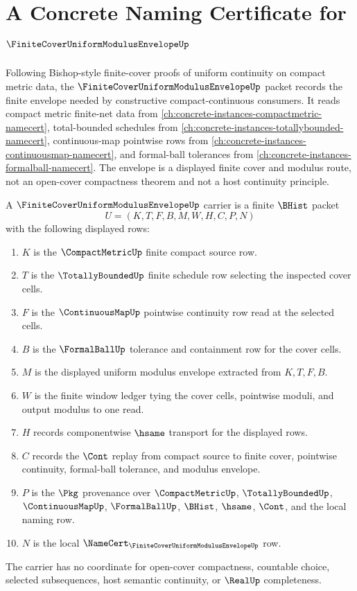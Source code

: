 \chapter{A Concrete Naming Certificate for $\FiniteCoverUniformModulusEnvelopeUp$}
\label{ch:concrete-instances-finite-cover-uniform-modulus-envelope-namecert}

Following Bishop-style finite-cover proofs of uniform continuity on compact metric data, the $\FiniteCoverUniformModulusEnvelopeUp$ packet records the finite envelope needed by constructive compact-continuous consumers. It reads compact metric finite-net data from \autoref{ch:concrete-instances-compactmetric-namecert}, total-bounded schedules from \autoref{ch:concrete-instances-totallybounded-namecert}, continuous-map pointwise rows from \autoref{ch:concrete-instances-continuousmap-namecert}, and formal-ball tolerances from \autoref{ch:concrete-instances-formalball-namecert}. The envelope is a displayed finite cover and modulus route, not an open-cover compactness theorem and not a host continuity principle.

\begin{definition}
\label{def:finite-cover-uniform-modulus-envelope-carrier}
A $\FiniteCoverUniformModulusEnvelopeUp$ carrier is a finite $\BHist$ packet
$$
U=(K,T,F,B,M,W,H,C,P,N)
$$
with the following displayed rows:
\begin{enumerate}
\item $K$ is the $\CompactMetricUp$ finite compact source row.
\item $T$ is the $\TotallyBoundedUp$ finite schedule row selecting the inspected cover cells.
\item $F$ is the $\ContinuousMapUp$ pointwise continuity row read at the selected cells.
\item $B$ is the $\FormalBallUp$ tolerance and containment row for the cover cells.
\item $M$ is the displayed uniform modulus envelope extracted from $K,T,F,B$.
\item $W$ is the finite window ledger tying the cover cells, pointwise moduli, and output modulus to one read.
\item $H$ records componentwise $\hsame$ transport for the displayed rows.
\item $C$ records the $\Cont$ replay from compact source to finite cover, pointwise continuity, formal-ball tolerance, and modulus envelope.
\item $P$ is the $\Pkg$ provenance over $\CompactMetricUp$, $\TotallyBoundedUp$, $\ContinuousMapUp$, $\FormalBallUp$, $\BHist$, $\hsame$, $\Cont$, and the local naming row.
\item $N$ is the local $\NameCert_{\FiniteCoverUniformModulusEnvelopeUp}$ row.
\end{enumerate}
The carrier has no coordinate for open-cover compactness, countable choice, selected subsequences, host semantic continuity, or $\RealUp$ completeness.
\end{definition}


